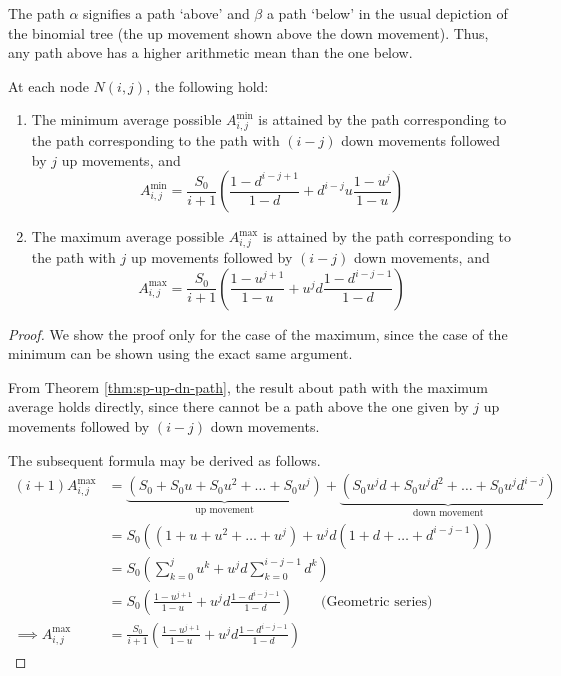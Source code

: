 \begin{rem}
	The path $\alpha$ signifies a path `above' and $\beta$ a path `below' in the usual depiction of the binomial tree (the up movement shown above the down movement). Thus, any path above  has a higher arithmetic mean than the one below.
\end{rem}


\begin{crr}
	\label{crr:sp-up-dn-path}
	At each node $ N(i,j) $, the following hold:
	\begin{enumerate}
		\item The minimum average possible $ A_{i,j}^{\min} $ is attained by the path corresponding to the path corresponding to the path with $(i-j)$ down movements followed by $j$ up movements, and
		\begin{equation}  \label{eq:sp-Amin}
		A_{i,j}^{\min} = \frac{S_0}{i+1} \left( \frac{1 - d^{i-j+1}}{1-d} + d^{i-j} u \frac{1 - u^{j}}{1-u} \right)
		\end{equation}
		\item The maximum average possible $ A_{i,j}^{\max} $ is attained by the path corresponding to the path with $j$ up movements followed by $(i-j)$ down movements, and
		\begin{equation} \label{eq:sp-Amax}
		A_{i,j}^{\max} = \frac{S_0}{i+1} \left( \frac{1 - u^{j+1}}{1-u} + u^{j} d \frac{1 - d^{i-j-1}}{1-d} \right)
		\end{equation}
	\end{enumerate}
\end{crr}

\begin{proof}
	We show the proof only for the case of the maximum, since the case of the minimum can be shown using the exact same argument.
	
	From Theorem \ref{thm:sp-up-dn-path}, the result about path with the maximum average holds directly, since there cannot be a path above the one given by $j$ up movements followed by $(i-j)$ down movements.
	
	The subsequent formula may be derived as follows.
	\begin{align*}
		(i+1) A_{i,j}^{\max} &= \underbrace{ ( S_0 + S_0 u + S_0 u^2 + \dots + S_0 u^j ) }_\text{up movement} + \underbrace{ ( S_0 u^j d + S_0 u^j d^2 + \dots + S_0 u^j d^{i-j} ) }_\text{down movement} \\
		&= S_0 ( (1 + u + u^2 + \dots + u^j ) + u^j d ( 1 + d + \dots + d^{i-j-1} ) ) \\
		&= S_0 \left( \sum_{k=0}^j u^k + u^j d \sum_{k=0}^{i-j-1} d^k \right) \\
		&= S_0 \left( \frac{1 - u^{j+1}}{1-u} + u^{j} d \frac{1 - d^{i-j-1}}{1-d} \right) \qquad \text{(Geometric series)} \\
		\implies A_{i,j}^{\max} &= \frac{S_0}{i+1} \left( \frac{1 - u^{j+1}}{1-u} + u^{j} d \frac{1 - d^{i-j-1}}{1-d} \right)
	\end{align*}
\end{proof}

